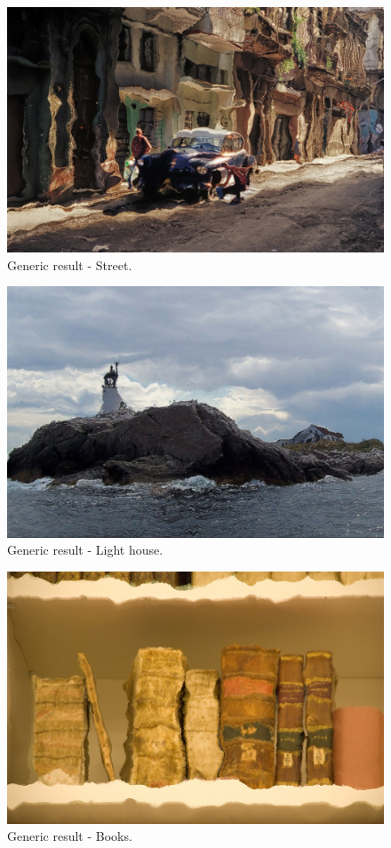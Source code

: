 \begin{figure}\centering
\includegraphics[width=5.9in]{images/generic-street.jpg}
\caption{Generic result - Street.}    
\end{figure}
\begin{figure}\centering
\includegraphics[width=5.9in]{images/generic-lighthouse.jpg}
\caption{Generic result - Light house.}    
\end{figure}
\begin{figure}\centering
\includegraphics[width=5.9in]{images/generic-books.jpg}
\caption{Generic result - Books.}    \label{fig:generic-books}
\end{figure}

